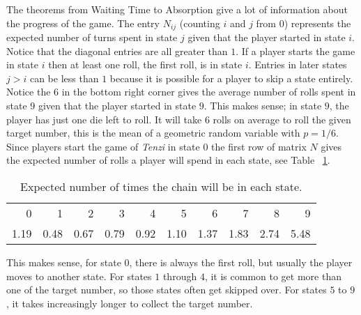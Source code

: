 \documentclass[12pt]{article}
\begin{document}
The theorems from 
{Waiting Time to Absorption} give a lot of information about the
progress of the game.  The entry \( N_ {ij} \) (counting \( i \) and \(
j \) from \( 0 \)) represents the expected number of turns spent in
state \( j \) given that the player started in state \( i \).  Notice
that the diagonal entries are all greater than \( 1 \).  If a player
starts the game in state \( i \) then at least one roll, the first roll,
is in state \( i \).  Entries in later states \( j>i \) can be less than
\( 1 \) because it is possible for a player to skip a state entirely.
Notice the \( 6 \) in the bottom right corner gives the average number
of rolls spent in state \( 9 \) given that the player started in state \(
9 \).  This makes sense; in state \( 9 \), the player has just one die
left to roll.  It will take \( 6 \) rolls on average to roll the given
target number, this is the mean of a geometric random variable with \( p
= 1/6 \).  Since players start the game of \emph{Tenzi} in state \( 0 \)
the first row of matrix \( N \) gives the expected number of rolls a
player will spend in each state, see Table~%
\ref{tab:games:tenzimean}.
\begin{table}
    \centering
    \begin{tabular}{rrrrrrrrrr}
        0    & 1    & 2    & 3    & 4    & 5    & 6    & 7    & 8    & 9    \\ 
        1.19 & 0.48 & 0.67 & 0.79 & 0.92 & 1.10 & 1.37 & 1.83 & 2.74 & 5.48
    \end{tabular}
    \caption{Expected number of times the chain will be in each state.}%
    \label{tab:games:tenzimean}
\end{table}
This makes sense, for state \( 0 \), there is always the first roll, but
usually the player moves to another state.  For states \( 1 \) through \(
4 \), it is common to get more than one of the target number, so those
states often get skipped over.  For states \( 5 \) to \( 9 \), it takes
increasingly longer to collect the target number.
\end{document}

